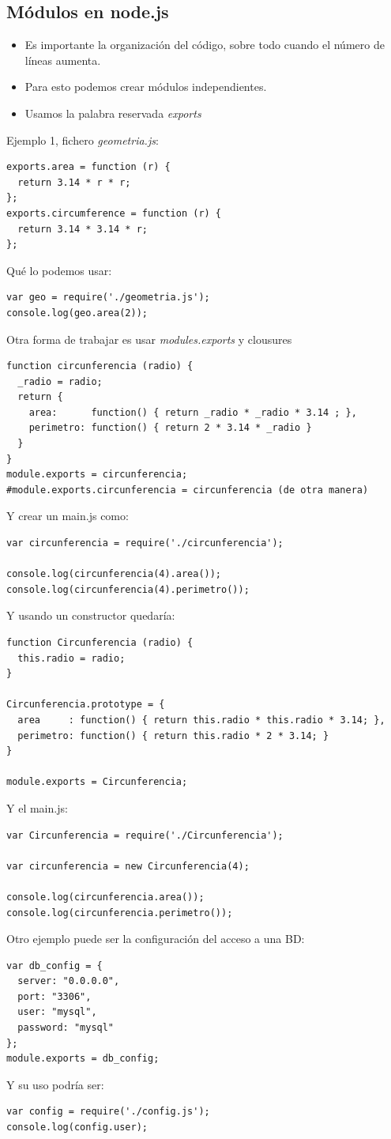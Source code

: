 \documentclass[4paper]{article}
\newcommand{\N}{node.js}
\begin{document}
\subsection{Módulos en \N}
\begin{itemize}
\item Es importante la organización del código, sobre todo cuando el número de líneas aumenta.
\item Para esto podemos crear módulos independientes.
\item Usamos la palabra reservada \emph{exports}
\end{itemize}
Ejemplo 1, fichero \emph{geometria.js}:
\begin{lstlisting}
exports.area = function (r) {
  return 3.14 * r * r;
};
exports.circumference = function (r) {
  return 3.14 * 3.14 * r;
};
\end{lstlisting}
Qué lo podemos usar:
\begin{lstlisting}
var geo = require('./geometria.js');
console.log(geo.area(2));
\end{lstlisting}
Otra forma de trabajar es usar \emph{modules.exports} y clousures
\begin{lstlisting}
function circunferencia (radio) {
  _radio = radio;
  return {
    area:      function() { return _radio * _radio * 3.14 ; },
    perimetro: function() { return 2 * 3.14 * _radio }
  }
}
module.exports = circunferencia;
#module.exports.circunferencia = circunferencia (de otra manera)
\end{lstlisting}
Y crear un main.js como:
\begin{lstlisting}
var circunferencia = require('./circunferencia');

console.log(circunferencia(4).area());
console.log(circunferencia(4).perimetro());
\end{lstlisting}
\newpage
Y usando un constructor quedaría:
\begin{lstlisting}
function Circunferencia (radio) {
  this.radio = radio;
}

Circunferencia.prototype = {
  area     : function() { return this.radio * this.radio * 3.14; },
  perimetro: function() { return this.radio * 2 * 3.14; }
}

module.exports = Circunferencia;
\end{lstlisting}
Y el main.js:
\begin{lstlisting}
var Circunferencia = require('./Circunferencia');

var circunferencia = new Circunferencia(4);

console.log(circunferencia.area());
console.log(circunferencia.perimetro());
\end{lstlisting} 
Otro ejemplo puede ser la configuración del acceso a una BD:
\begin{lstlisting}
var db_config = {
  server: "0.0.0.0",
  port: "3306",
  user: "mysql",
  password: "mysql"
};
module.exports = db_config;
\end{lstlisting}
Y su uso podría ser:
\begin{lstlisting}
var config = require('./config.js');
console.log(config.user);
\end{lstlisting}
\end{document}
